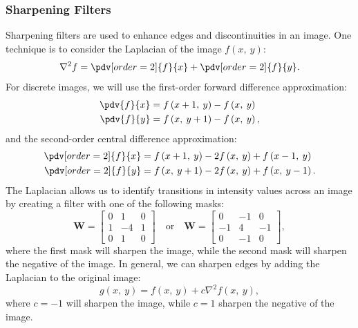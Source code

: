 \documentclass{article}
\begin{document}
\subsubsection{Sharpening Filters}
Sharpening filters are used to enhance edges and discontinuities in an
image. One technique is to consider the Laplacian of the image
\(f\left( x,\: y \right)\):
\begin{equation*}
    \nabla^2 f = \pdv[order=2]{f}{x} + \pdv[order=2]{f}{y}.
\end{equation*}
For discrete images, we will use the first-order forward difference
approximation:
\begin{align*}
    \pdv{f}{x} & = f\left( x + 1,\: y \right) - f\left( x,\: y \right)  \\
    \pdv{f}{y} & = f\left( x,\: y + 1 \right) - f\left( x,\: y \right),
\end{align*}
and the second-order central difference approximation:
\begin{align*}
    \pdv[order=2]{f}{x} & = f\left( x + 1,\: y \right) - 2f\left( x,\: y \right) + f\left( x - 1,\: y \right)  \\
    \pdv[order=2]{f}{y} & = f\left( x,\: y + 1 \right) - 2f\left( x,\: y \right) + f\left( x,\: y - 1 \right).
\end{align*}
The Laplacian allows us to identify transitions in intensity values
across an image by creating a filter with one of the following masks:
\begin{equation*}
    \symbf{W} =
    \begin{bmatrix}
        0 & 1  & 0 \\
        1 & -4 & 1 \\
        0 & 1  & 0
    \end{bmatrix}
    \quad \text{or} \quad \symbf{W} =
    \begin{bmatrix}
        0  & -1 & 0  \\
        -1 & 4  & -1 \\
        0  & -1 & 0
    \end{bmatrix}
    ,
\end{equation*}
where the first mask will sharpen the image, while the second mask will
sharpen the negative of the image. In general, we can sharpen edges by
adding the Laplacian to the original image:
\begin{equation*}
    g\left( x,\: y \right) = f\left( x,\: y \right) + c \nabla^2 f\left( x,\: y \right),
\end{equation*}
where \(c = -1\) will sharpen the image, while \(c = 1\) sharpen the
negative of the image.
\end{document}
